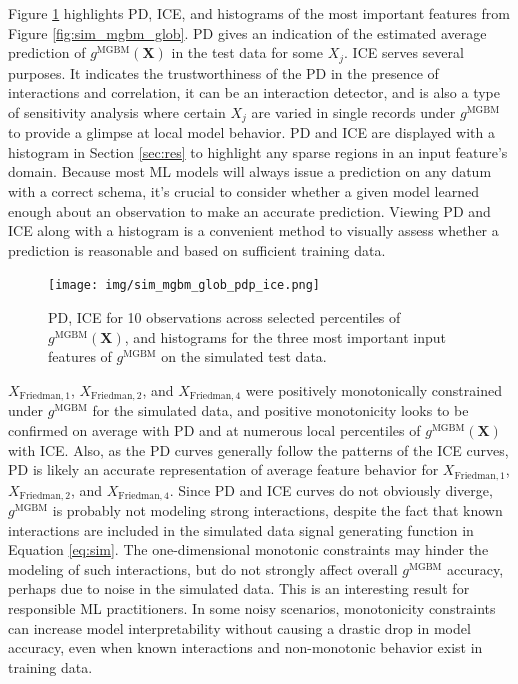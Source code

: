 \documentclass[information,article,submit,moreauthors,pdftex]{definitions/mdpi}
\begin{document}
Figure \ref{fig:sim_mgbm_glob_pdp_ice} highlights PD, ICE, and histograms of the most important features from Figure \ref{fig:sim_mgbm_glob}. PD gives an indication of the estimated average prediction of $g^\text{MGBM}(\mathbf{X})$ in the test data for some $X_j$. ICE serves several purposes. It indicates the trustworthiness of the PD in the presence of interactions and correlation, it can be an interaction detector, and is also a type of sensitivity analysis where certain $X_j$ are varied in single records under $g^\text{MGBM}$ to provide a glimpse at local model behavior. PD and ICE are displayed with a histogram in Section \ref{sec:res} to highlight any sparse regions in an input feature's domain. Because most ML models will always issue a prediction on any datum with a correct schema, it's crucial to consider whether a given model learned enough about an observation to make an accurate prediction. Viewing PD and ICE along with a histogram is a convenient method to visually assess whether a prediction is reasonable and based on sufficient training data.

\begin{figure}[H]
	\centering
	\texttt{[image: img/sim\_mgbm\_glob\_pdp\_ice.png]}
	\caption{PD, ICE for 10 observations across selected percentiles of $g^\text{MGBM}(\mathbf{X})$, and histograms for the three most important input features of $g^\text{MGBM}$ on the simulated test data.}
	\label{fig:sim_mgbm_glob_pdp_ice}
\end{figure}   

$X_{\text{Friedman},1}$, $X_{\text{Friedman},2}$, and $X_{\text{Friedman},4}$ were positively monotonically constrained under $g^\text{MGBM}$ for the simulated data, and positive monotonicity looks to be confirmed on average with PD and at numerous local percentiles of $g^\text{MGBM}(\mathbf{X})$ with ICE. Also, as the PD curves generally follow the patterns of the ICE curves, PD is likely an accurate representation of average feature behavior for $X_{\text{Friedman},1}$, $X_{\text{Friedman},2}$, and $X_{\text{Friedman},4}$. Since PD and ICE curves do not obviously diverge, $g^\text{MGBM}$ is probably not modeling strong interactions, despite the fact that known interactions are included in the simulated data signal generating function in Equation \ref{eq:sim}. The one-dimensional monotonic constraints may hinder the modeling of such interactions, but do not strongly affect overall $g^\text{MGBM}$ accuracy, perhaps due to noise in the simulated data. This is an interesting result for responsible ML practitioners. In some noisy scenarios, monotonicity constraints can increase model interpretability without causing a drastic drop in model accuracy, even when known interactions and non-monotonic behavior exist in training data.
\end{document}
